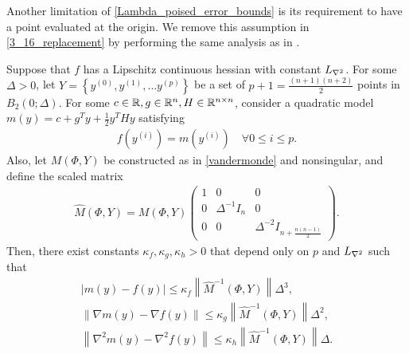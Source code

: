 Another limitation of \cref{Lambda_poised_error_bounds} is its requirement to have a point evaluated at the origin.
We remove this assumption in \cref{3_16_replacement} by performing the same analysis as in \cite[Theorem 3.16]{introduction_book}.
\begin{theorem}
\label{3_16_replacement}
Suppose that $f$ has a Lipschitz continuous hessian with constant ${L_{\nabla^2}}$.
For some $\Delta > 0$, let $Y = \left\{y^{(0)}, y^{(1)}, \ldots y^{(p)} \right\}$ be a set of $p+1=\frac{(n+1)(n+2)}{2}$ points in
$B_2\left(0; \Delta\right)$.
For some $c \in \mathbb R, g \in \mathbb R^n, H \in \mathbb R^{n \times n}$, consider a quadratic model $m(y) = c + g^T y + \frac 1 2 y^T H y$  satisfying
\begin{align}
f\left(y^{(i)}\right) = m\left(y^{(i)}\right) \quad \forall 0 \le i \le p. \label{nce_interpolation_condition}
\end{align}
Also, let $M(\Phi,Y)$ be constructed as in \cref{vandermonde} and nonsingular, and define the scaled matrix
\begin{align}
\hat M(\Phi, Y) = M(\Phi,Y) \begin{pmatrix}
1 & 0 & 0 \\
0 & \Delta^{-1} I_n & 0 \\
0 & 0 & \Delta^{-2} I_{n + \frac{n(n-1)}{2}}
\end{pmatrix}. \label{nce_scale}
\end{align}
Then, there exist constants $\kappa_f, \kappa_g, \kappa_h>0$ that depend only on $p$ and ${L_{\nabla^2}}$ such that
\begin{align*}
\left|m(y) - f(y)\right| \le \kappa_f \left\|\hat M^{-1}(\Phi, Y) \right\| \Delta^3, \\
\left\|\nabla m(y) - \nabla f(y)\right\| \le \kappa_g \left\|\hat M^{-1}(\Phi, Y) \right\|\Delta^2, \\
\left\|\nabla^2 m(y) - \nabla^2 f(y)\right\| \le \kappa_h \left\|\hat M^{-1}(\Phi, Y) \right\|\Delta.
\end{align*}
\end{theorem}

